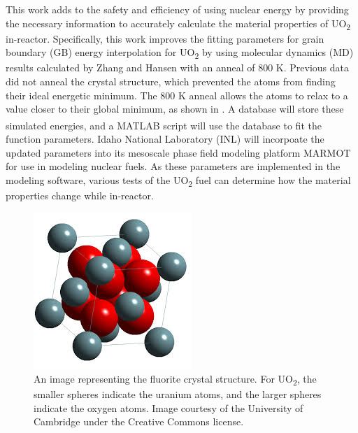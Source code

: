 \documentclass[twoside,senior]{BYUPhys}
\begin{document}
This work adds to the safety and efficiency of using nuclear energy by providing the necessary information to accurately calculate the material properties of UO\textsubscript{2} in-reactor.  Specifically, this work improves the fitting parameters for grain boundary (GB) energy interpolation for UO\textsubscript{2} by using molecular dynamics (MD) results calculated by Zhang\cite{zhang2016} and Hansen\cite{hansen2016} with an anneal of 800 K.  Previous data did not anneal the crystal structure\cite{harbison2015}, which prevented the atoms from finding their ideal energetic minimum.  The 800 K anneal allows the atoms to relax to a value closer to their global minimum, as shown in .  A database will store these simulated energies, and a MATLAB\textsuperscript{\textregistered} script will use the database to fit the function parameters.  Idaho National Laboratory (INL) will incorpoate the updated parameters into its mesoscale phase field modeling platform MARMOT for use in modeling nuclear fuels.  As these parameters are implemented in the modeling software, various tests of the UO\textsubscript{2} fuel can determine how the material properties change while in-reactor. 

\begin{figure}[ht!]
\centering
\includegraphics[scale=1.0]{Images/UO2}
\caption[Example of the fluorite crystal structure.]{\label{fig:uo2Lattice}An image representing the fluorite crystal structure.  For UO\textsubscript{2}, the smaller spheres indicate the uranium atoms, and the larger spheres indicate the oxygen atoms.  Image courtesy of the University of Cambridge under the Creative Commons license.}
\end{figure}
\end{document}
